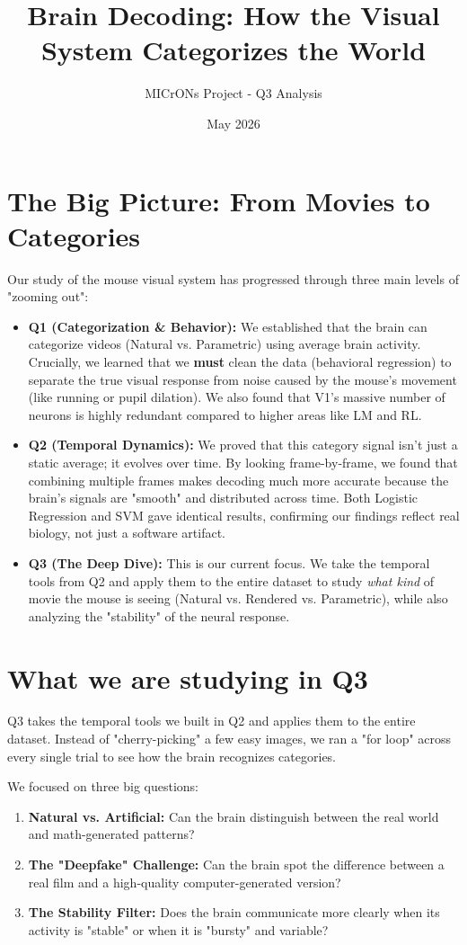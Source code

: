 \documentclass[11pt]{article}
\title{Brain Decoding: How the Visual System Categorizes the World}
\author{MICrONs Project - Q3 Analysis}
\date{May 2026}
\begin{document}
\maketitle

\section{The Big Picture: From Movies to Categories}
Our study of the mouse visual system has progressed through three main levels of "zooming out":
\begin{itemize}
    \item \textbf{Q1 (Categorization \& Behavior):} We established that the brain can categorize videos (Natural vs. Parametric) using average brain activity. Crucially, we learned that we \textbf{must} clean the data (behavioral regression) to separate the true visual response from noise caused by the mouse's movement (like running or pupil dilation). We also found that V1's massive number of neurons is highly redundant compared to higher areas like LM and RL.
    \item \textbf{Q2 (Temporal Dynamics):} We proved that this category signal isn't just a static average; it evolves over time. By looking frame-by-frame, we found that combining multiple frames makes decoding much more accurate because the brain's signals are "smooth" and distributed across time. Both Logistic Regression and SVM gave identical results, confirming our findings reflect real biology, not just a software artifact.
    \item \textbf{Q3 (The Deep Dive):} This is our current focus. We take the temporal tools from Q2 and apply them to the entire dataset to study \textit{what kind} of movie the mouse is seeing (Natural vs. Rendered vs. Parametric), while also analyzing the "stability" of the neural response.
\end{itemize}

\section{What we are studying in Q3}
Q3 takes the temporal tools we built in Q2 and applies them to the entire dataset. Instead of "cherry-picking" a few easy images, we ran a "for loop" across every single trial to see how the brain recognizes categories. 

We focused on three big questions:
\begin{enumerate}
    \item \textbf{Natural vs. Artificial:} Can the brain distinguish between the real world and math-generated patterns?
    \item \textbf{The "Deepfake" Challenge:} Can the brain spot the difference between a real film and a high-quality computer-generated version?
    \item \textbf{The Stability Filter:} Does the brain communicate more clearly when its activity is "stable" or when it is "bursty" and variable?
\end{enumerate}
\end{document}
